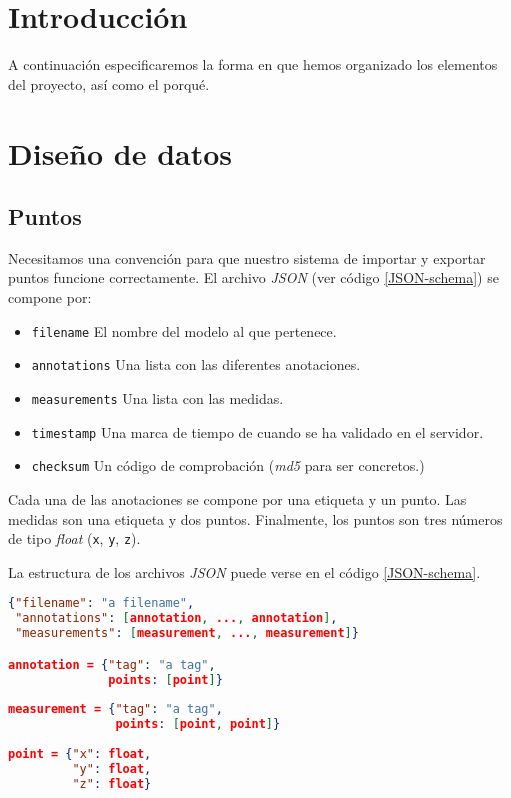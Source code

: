 
\section{Introducción}
A continuación especificaremos la forma en que hemos organizado los elementos del proyecto, así como el porqué.

\section{Diseño de datos}
\subsection{Puntos}
Necesitamos una convención para que nuestro sistema de importar y exportar puntos funcione correctamente. El archivo \textit{JSON} (ver código \ref{JSON-schema}) se compone por:
\begin{itemize}
	\item \texttt{filename} El nombre del modelo al que pertenece.
	\item \texttt{annotations} Una lista con las diferentes anotaciones.
	\item \texttt{measurements} Una lista con las medidas.
	\item \texttt{timestamp} Una marca de tiempo de cuando se ha validado en el servidor.
	\item \texttt{checksum} Un código de comprobación (\textit{md5} para ser concretos.)
\end{itemize}
Cada una de las anotaciones se compone por una etiqueta y un punto. Las medidas son una etiqueta y dos puntos. Finalmente, los puntos son tres números de tipo \textit{float} (\texttt{x}, \texttt{y}, \texttt{z}).

La estructura de los archivos \textit{JSON} puede verse en el código \ref{JSON-schema}.

\begin{lstlisting}[language=json, float, caption=Esquema JSON, label=JSON-schema]
{"filename": "a filename",
 "annotations": [annotation, ..., annotation],
 "measurements": [measurement, ..., measurement]}

annotation = {"tag": "a tag",
              points: [point]}
		
measurement = {"tag": "a tag",
               points: [point, point]}
		  
point = {"x": float,
         "y": float,
         "z": float}
\end{lstlisting}


